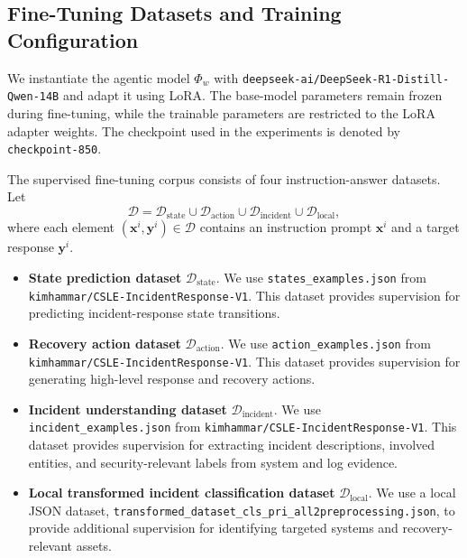 \subsection{Fine-Tuning Datasets and Training Configuration}

We instantiate the agentic model $\Phi_w$ with
\texttt{deepseek-ai/DeepSeek-R1-Distill-Qwen-14B} and adapt it using LoRA. The
base-model parameters remain frozen during fine-tuning, while the trainable
parameters are restricted to the LoRA adapter weights. The checkpoint used in
the experiments is denoted by \texttt{checkpoint-850}.

The supervised fine-tuning corpus consists of four instruction-answer datasets.
Let
\[
    \mathcal{D}
    =
    \mathcal{D}_{\mathrm{state}}
    \cup
    \mathcal{D}_{\mathrm{action}}
    \cup
    \mathcal{D}_{\mathrm{incident}}
    \cup
    \mathcal{D}_{\mathrm{local}},
\]
where each element $(\mathbf{x}^i,\mathbf{y}^i)\in\mathcal{D}$ contains an
instruction prompt $\mathbf{x}^i$ and a target response $\mathbf{y}^i$.

\begin{itemize}
    \item \textbf{State prediction dataset}
    $\mathcal{D}_{\mathrm{state}}$. We use \texttt{states\_examples.json} from
    \texttt{kimhammar/CSLE-IncidentResponse-V1}. This dataset provides
    supervision for predicting incident-response state transitions.

    \item \textbf{Recovery action dataset}
    $\mathcal{D}_{\mathrm{action}}$. We use \texttt{action\_examples.json} from
    \texttt{kimhammar/CSLE-IncidentResponse-V1}. This dataset provides
    supervision for generating high-level response and recovery actions.

    \item \textbf{Incident understanding dataset}
    $\mathcal{D}_{\mathrm{incident}}$. We use \texttt{incident\_examples.json}
    from \texttt{kimhammar/CSLE-IncidentResponse-V1}. This dataset provides
    supervision for extracting incident descriptions, involved entities, and
    security-relevant labels from system and log evidence.

    \item \textbf{Local transformed incident classification dataset}
    $\mathcal{D}_{\mathrm{local}}$. We use a local JSON dataset,
    \texttt{transformed\_dataset\_cls\_pri\_all2preprocessing.json}, to provide
    additional supervision for identifying targeted systems and
    recovery-relevant assets.
\end{itemize}

